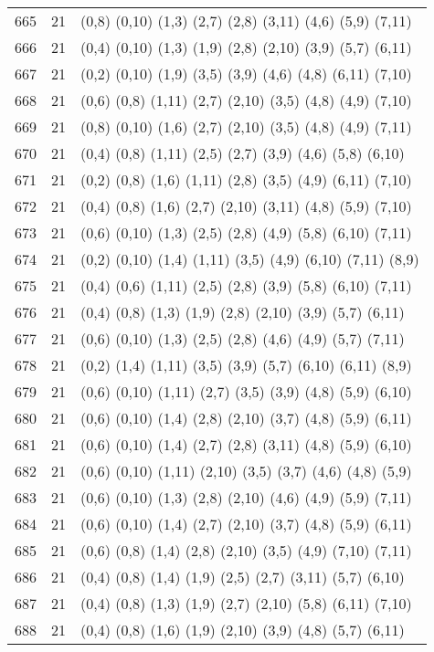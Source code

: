 {\begin{longtable}{lll}
665 & 21 & (0,8) (0,10) (1,3) (2,7) (2,8) (3,11) (4,6) (5,9) (7,11) \\
666 & 21 & (0,4) (0,10) (1,3) (1,9) (2,8) (2,10) (3,9) (5,7) (6,11) \\
667 & 21 & (0,2) (0,10) (1,9) (3,5) (3,9) (4,6) (4,8) (6,11) (7,10) \\
668 & 21 & (0,6) (0,8) (1,11) (2,7) (2,10) (3,5) (4,8) (4,9) (7,10) \\
669 & 21 & (0,8) (0,10) (1,6) (2,7) (2,10) (3,5) (4,8) (4,9) (7,11) \\
670 & 21 & (0,4) (0,8) (1,11) (2,5) (2,7) (3,9) (4,6) (5,8) (6,10) \\
671 & 21 & (0,2) (0,8) (1,6) (1,11) (2,8) (3,5) (4,9) (6,11) (7,10) \\
672 & 21 & (0,4) (0,8) (1,6) (2,7) (2,10) (3,11) (4,8) (5,9) (7,10) \\
673 & 21 & (0,6) (0,10) (1,3) (2,5) (2,8) (4,9) (5,8) (6,10) (7,11) \\
674 & 21 & (0,2) (0,10) (1,4) (1,11) (3,5) (4,9) (6,10) (7,11) (8,9) \\
675 & 21 & (0,4) (0,6) (1,11) (2,5) (2,8) (3,9) (5,8) (6,10) (7,11) \\
676 & 21 & (0,4) (0,8) (1,3) (1,9) (2,8) (2,10) (3,9) (5,7) (6,11) \\
677 & 21 & (0,6) (0,10) (1,3) (2,5) (2,8) (4,6) (4,9) (5,7) (7,11) \\
678 & 21 & (0,2) (1,4) (1,11) (3,5) (3,9) (5,7) (6,10) (6,11) (8,9) \\
679 & 21 & (0,6) (0,10) (1,11) (2,7) (3,5) (3,9) (4,8) (5,9) (6,10) \\
680 & 21 & (0,6) (0,10) (1,4) (2,8) (2,10) (3,7) (4,8) (5,9) (6,11) \\
681 & 21 & (0,6) (0,10) (1,4) (2,7) (2,8) (3,11) (4,8) (5,9) (6,10) \\
682 & 21 & (0,6) (0,10) (1,11) (2,10) (3,5) (3,7) (4,6) (4,8) (5,9) \\
683 & 21 & (0,6) (0,10) (1,3) (2,8) (2,10) (4,6) (4,9) (5,9) (7,11) \\
684 & 21 & (0,6) (0,10) (1,4) (2,7) (2,10) (3,7) (4,8) (5,9) (6,11) \\
685 & 21 & (0,6) (0,8) (1,4) (2,8) (2,10) (3,5) (4,9) (7,10) (7,11) \\
686 & 21 & (0,4) (0,8) (1,4) (1,9) (2,5) (2,7) (3,11) (5,7) (6,10) \\
687 & 21 & (0,4) (0,8) (1,3) (1,9) (2,7) (2,10) (5,8) (6,11) (7,10) \\
688 & 21 & (0,4) (0,8) (1,6) (1,9) (2,10) (3,9) (4,8) (5,7) (6,11) \\

\end{longtable}}
